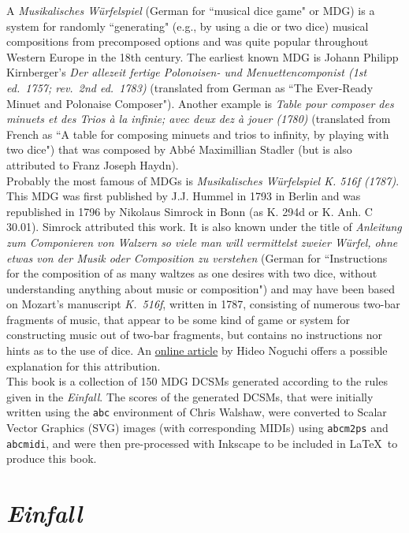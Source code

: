 \documentclass[a4paper,x11names,svgnames,10pt]{article}
\begin{document}
{A {\it Musikalisches W\"{u}rfelspiel} (German for ``musical dice game" or MDG) is a system for randomly ``generating" (e.g., by using a die or two dice) musical compositions from precomposed options and was quite popular throughout Western Europe in the 18th century.  The earliest known MDG is Johann Philipp Kirnberger's {\em Der allezeit fertige Polonoisen- und Menuettencomponist (1st ed.\ 1757; rev.\ 2nd ed.\ 1783)} (translated from German as ``The Ever-Ready Minuet and Polonaise Composer"). Another example is {\em Table pour composer des minuets et des Trios \`{a} la infinie; avec deux dez \`{a} jouer (1780)} (translated from French as ``A table for composing minuets and trios to infinity, by playing with two dice") that was composed by Abb\'{e} Maximillian Stadler (but is also attributed to Franz Joseph Haydn). \\

Probably the most famous of MDGs is {\it Musikalisches W\"{u}rfelspiel K. 516f (1787)}.  This MDG was first published by J.J. Hummel in 1793 in Berlin and was republished in 1796 by Nikolaus Simrock in Bonn (as K. 294d or K. Anh. C 30.01). Simrock attributed this work. It is also known under the title of {\em Anleitung zum Componieren von Walzern so viele man will vermittelst zweier W\"{u}rfel, ohne etwas von der Musik oder Composition zu verstehen} (German for ``Instructions for the composition of as many waltzes as one desires with two dice, without understanding anything about music or composition") and may have been based on Mozart's manuscript {\em K.\ 516f}, written in 1787, consisting of numerous two-bar fragments of music, that appear to be some kind of game or system for constructing music out of two-bar fragments, but contains no instructions nor hints as to the use of dice.  An \href{(http://www.asahi-net.or.jp/\~rb5h-ngc/e/k516f.htm}{online article} by Hideo Noguchi offers a possible explanation for this attribution. \\

This book is a collection of 150 MDG DCSMs generated according to the rules given in the {\it Einfall}. The scores of the generated DCSMs, that were initially written using the \texttt{abc} environment of Chris Walshaw, were converted to Scalar Vector Graphics (SVG) images (with corresponding MIDIs) using {\tt abcm2ps} and {\tt abcmidi}, and were then pre-processed with Inkscape to be included in \LaTeX\ to produce this book.


\section{\em Einfall}

}
\end{document}
